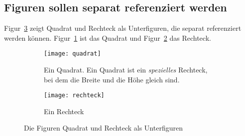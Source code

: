 \documentclass[12pt,a4paper]{scrartcl}
\newcommand{\figref}[1]{Figur~\ref{#1}}
\begin{document}
\subsection{Figuren sollen separat referenziert werden}
%
\figref{fig:quad_recht_subfigure} zeigt Quadrat und Rechteck als
Unterfiguren, die separat referenziert werden können.
\figref{subfig:quad} ist das Quadrat und \figref{subfig:recht} das Rechteck.
\begin{figure}[ht]
  \begin{subfigure}[t]{0.49\textwidth}
    \centering
    \texttt{[image: quadrat]}
    \caption[Quadrat]{Ein Quadrat. Ein Quadrat ist ein \emph{spezielles}
      Rechteck, bei dem die Breite und die Höhe gleich sind.}
    \label{subfig:quad}
  \end{subfigure}
  \begin{subfigure}[t]{0.49\textwidth}
    \centering
    \texttt{[image: rechteck]}
    \caption[Rechteck]{Ein Rechteck}
    \label{subfig:recht}
  \end{subfigure}
  \caption[Geometrische Figuren (Unterfiguren)]{Die Figuren Quadrat und Rechteck als Unterfiguren}
  \label{fig:quad_recht_subfigure}
\end{figure}
%
\end{document}
